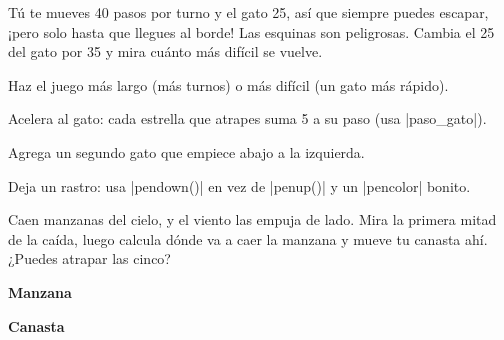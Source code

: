 \begin{think}
Tú te mueves 40 pasos por turno y el gato 25, así que siempre puedes escapar, ¡pero solo hasta que llegues al borde! Las esquinas son peligrosas. Cambia el 25 del gato por 35 y mira cuánto más difícil se vuelve.
\end{think}

\enlargethispage{\baselineskip}
\begin{challenge}\small
\tick Haz el juego más largo (más turnos) o más difícil (un gato más rápido).\par
\tick Acelera al gato: cada estrella que atrapes suma 5 a su paso (usa \py|paso_gato|).\par
\tick Agrega un segundo gato que empiece abajo a la izquierda.\par
\tick Deja un rastro: usa \py|pendown()| en vez de \py|penup()| y un \py|pencolor| bonito.
\end{challenge}


Caen manzanas del cielo, y el viento las empuja de lado. Mira la primera mitad de la caída, luego calcula dónde va a caer la manzana y mueve tu canasta ahí. ¿Puedes atrapar las cinco?

\begin{center}
\begin{minipage}[t]{0.6\linewidth}
\textbf{Manzana}\par
\begin{scratch}[scale=0.9]
\end{scratch}
\end{minipage}\hfill
\begin{minipage}[t]{0.37\linewidth}
\textbf{Canasta}\par
\begin{scratch}[scale=0.82]
\end{scratch}
\end{minipage}
\end{center}

